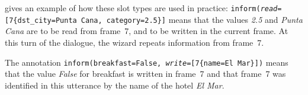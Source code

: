 \documentclass{article}
\theoremstyle{definition}
\begin{document}
 gives an example of how these slot types are used in practice: \texttt{inform(\linebreak[1]\emph{read}=[7\{dst\_city=Punta Cana, category=2.5\}]} means that the values \textit{2.5} and \textit{Punta Cana} are to be read from frame~7, and to be written in the current frame. At this turn of the dialogue, the wizard repeats information from frame~7.

The annotation  \texttt{inform(breakfast=False, \emph{write}=[7\{name=El Mar\}])} means that the value \textit{False} for breakfast is written in frame~7 and that frame~7 was identified in this utterance by the name of the hotel \textit{El Mar}. 
\end{document}
